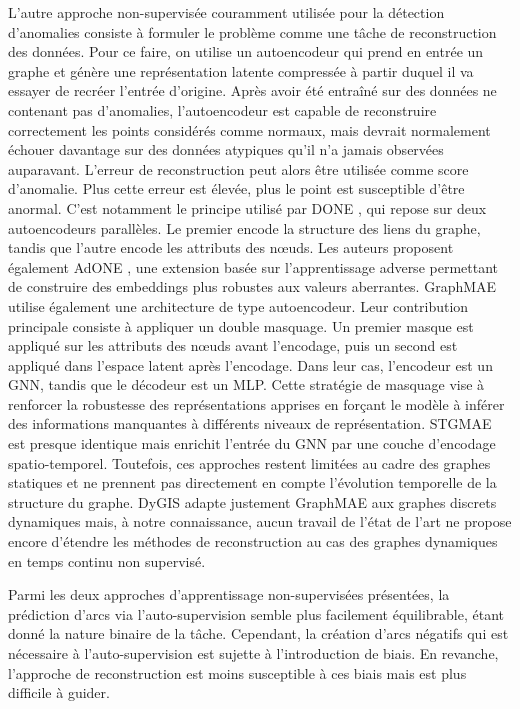 \documentclass[a4paper,11pt,twoside]{StyleThese}
\begin{document}
L’autre approche non-supervisée couramment utilisée pour la détection d’anomalies consiste à formuler le problème comme une tâche de reconstruction des données. Pour ce faire, on utilise un autoencodeur qui prend en entrée un graphe et génère une représentation latente compressée à partir duquel il va essayer de recréer l’entrée d’origine. Après avoir été entraîné sur des données ne contenant pas d’anomalies, l’autoencodeur est capable de reconstruire correctement les points considérés comme normaux, mais devrait normalement échouer davantage sur des données atypiques qu’il n’a jamais observées auparavant. L’erreur de reconstruction peut alors être utilisée comme score d’anomalie. Plus cette erreur est élevée, plus le point est susceptible d’être anormal. C’est notamment le principe utilisé par DONE \cite{done}, qui repose sur deux autoencodeurs parallèles. Le premier encode la structure des liens du graphe, tandis que l’autre encode les attributs des nœuds. Les auteurs proposent également AdONE \cite{done}, une extension basée sur l’apprentissage adverse permettant de construire des embeddings plus robustes aux valeurs aberrantes. GraphMAE \cite{graphmae}  utilise également une architecture de type autoencodeur. Leur contribution principale consiste à appliquer un double masquage. Un premier masque est appliqué sur les attributs des nœuds avant l’encodage, puis un second est appliqué dans l’espace latent après l’encodage. Dans leur cas, l'encodeur est un GNN, tandis que le décodeur est un MLP. Cette stratégie de masquage vise à renforcer la robustesse des représentations apprises en forçant le modèle à inférer des informations manquantes à différents niveaux de représentation. STGMAE \cite{stmgae} est presque identique mais enrichit l'entrée du GNN par une couche d'encodage spatio-temporel. Toutefois, ces approches restent limitées au cadre des graphes statiques et ne prennent pas directement en compte l’évolution temporelle de la structure du graphe. DyGIS \cite{dygis} adapte justement GraphMAE aux graphes discrets dynamiques mais, à notre connaissance, aucun travail de l’état de l’art ne propose encore d’étendre les méthodes de reconstruction au cas des graphes dynamiques en temps continu non supervisé.

Parmi les deux approches d'apprentissage non-supervisées présentées, la prédiction d'arcs via l'auto-supervision semble plus facilement équilibrable, étant donné la nature binaire de la tâche. Cependant, la création d'arcs négatifs qui est nécessaire à l'auto-supervision est sujette à l'introduction de biais. En revanche, l'approche de reconstruction est moins susceptible à ces biais mais est plus difficile à guider.
\end{document}
